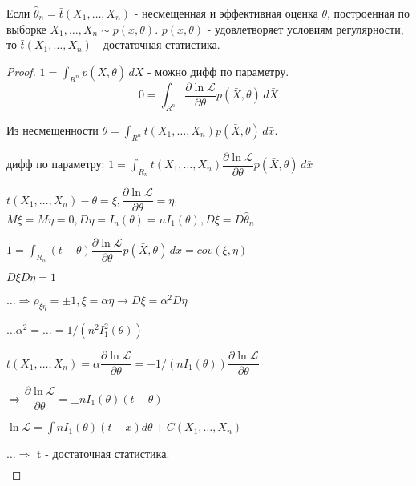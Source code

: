 \begin{theorem}
  Если $\hat\theta_n = \bar t(X_1, \dots, X_n)$ - несмещенная и эффективная оценка $\theta$, построенная по выборке $X_1, \dots, X_n \sim p(x, \theta)$. $p(x, \theta)$ - удовлетворяет условиям регулярности, то $\bar t(X_1, \dots, X_n)$ - достаточная статистика.
\end{theorem}
\begin{proof}
  $1 = \int_{R^n} p(\bar X, \theta) \, d\bar X$ - можно дифф по параметру.
  $$0 = \int_{R^n} \dfrac{\partial \ln \mathcal{L}}{\partial \theta} p(\bar X, \theta) \, d\bar X$$
  
  Из несмещенности $\theta = \int_{R^n} t(X_1, \dots, X_n) p(\bar X, \theta) \, d\bar x$.
  
  дифф по параметру: $1 = \int_{R_n} t(X_1, \dots, X_n) \dfrac{\partial \ln \mathcal{L}}{\partial \theta} p(\bar X, \theta) \, d\bar x$

  $t(X_1, \dots, X_n) - \theta = \xi, \dfrac{\partial \ln \mathcal{L}}{\partial \theta} = \eta$, $M\xi = M\eta = 0, D\eta = I_n(\theta) = n I_1(\theta), D\xi = D\hat\theta_n$ 

  $1 = \int_{R_n} (t-\theta) \dfrac{\partial \ln \mathcal{L}}{\partial \theta} p(\bar X, \theta) \, d\bar x = cov(\xi, \eta)$


   $D\xi D\eta = 1$

  $\dots \Rightarrow \rho_{\xi\eta} = \pm 1, \xi = \alpha\eta \rightarrow D\xi = \alpha^2 D\eta $
  
  $\dots \alpha^2 = \dots = 1 / (n^2 I_1^2(\theta))$

  $t(X_1, \dots, X_n) = \alpha \dfrac{\partial \ln \mathcal{L}}{\partial \theta} = \pm 1 / (n I_1(\theta)) \dfrac{\partial \ln \mathcal{L}}{\partial \theta}$

  $\Rightarrow \dfrac{\partial \ln \mathcal{L}}{\partial \theta} = \pm n I_1(\theta) (t-\theta)$

  $\ln \mathcal{L} = \int n I_1 (\theta) (t-x) d \theta + C(X_1, \dots, X_n)$

  $\dots \Rightarrow$ t - достаточная статистика.
  \begin{multline}
    
  \end{multline}
\end{proof}
